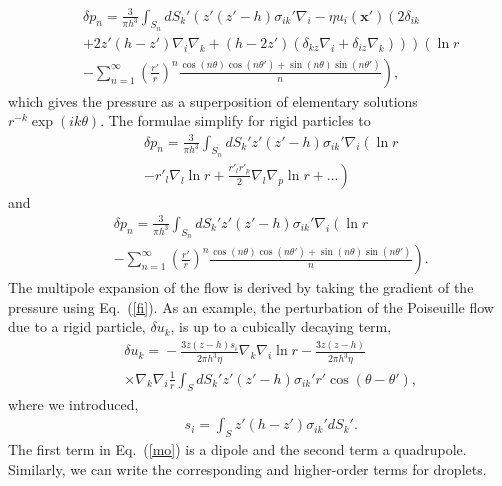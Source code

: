 \begin{eqnarray}&&\!\!\!\!\!\!\!\!\!
\delta p_n=\frac{3}{\pi h^3}\int_{S_n}dS_k' \left(
z'(z'-h) \sigma_{ik}'\nabla_i-\eta u_{i}(\bm x')\left(
2\delta_{ik}\nonumber\right.\right.\\&&\!\!\!\!\!\!\!\!\!\left.\left.+2z'(h\!-\!z')\nabla_i \nabla_k
+(h\!-\!2z')
\left(\delta_{kz}\nabla_i+\delta_{iz}\nabla_k \right)\right)\right)\left(\ln r\nonumber\right.\\&&\!\!\!\!\!\!\left.
-\sum_{n=1}^{\infty}\left(\frac{r'}{r}\right)^n\frac{\cos(n\theta)\cos(n\theta')+\sin(n\theta)\sin(n\theta')}{n}
\right),
\end{eqnarray}
which gives the pressure as a superposition of elementary solutions $r^{-k}\exp(ik\theta)$.
The formulae simplify for rigid particles to
\begin{eqnarray}&&\!\!\!\!\!\!\!\!\!
\delta p_n=\frac{3}{\pi h^3}\int_{S_n}dS_k'
z'(z'-h) \sigma_{ik}'\nabla_i\left(\ln r\nonumber\right.\\&&\!\!\!\!\!\!\left.
-r'_{l}\nabla_{l}\ln r+\frac{r'_{l}r'_{p}}{2}\nabla_{l}\nabla_{p}\ln r+\ldots
\right)
\end{eqnarray}
and
\begin{eqnarray}&&\!\!\!\!\!\!\!\!\!
\delta p_n=\frac{3}{\pi h^3}\int_{S_n}dS_k'
z'(z'-h) \sigma_{ik}'\nabla_i\left(\ln r\nonumber\right.\\&&\!\!\!\!\!\!\left.
-\sum_{n=1}^{\infty}\left(\frac{r'}{r}\right)^n\frac{\cos(n\theta)\cos(n\theta')+\sin(n\theta)\sin(n\theta')}{n}
\right).
\end{eqnarray}
The multipole expansion of the flow is derived by taking the gradient of the pressure using Eq.~(\ref{fi}). As an example, the perturbation  of the Poiseuille flow due to a rigid particle, $\delta u_k$, is up to a cubically decaying term,
\begin{eqnarray}&&
\delta u_k\!%
=\!-\frac{3z(z\!-\!h)s_i}{2\pi h^3\eta}\nabla_k \nabla_i \ln r -\frac{3z(z\!-\!h)}{2\pi h^3\eta}\nonumber \\&&\times\nabla_k \nabla_i\frac{1}{r}\int_{S}\!\!\!dS_k'z'(z'\!-\!h) \sigma_{ik}' r' \cos(\theta-\theta'),\label{mo}
\end{eqnarray}
where we introduced,
\begin{eqnarray}&&\!\!\!\!\!\!\!\!\!\!\!\!\!\!\!\!
s_i=\int_{S}\!\! z'(h\!-\!z') \sigma_{ik}'dS_k'. \label{dlpa}
\end{eqnarray}
The first term in Eq.~(\ref{mo}) is a dipole and the second term a quadrupole. Similarly, we can write the corresponding and higher-order terms for droplets.




